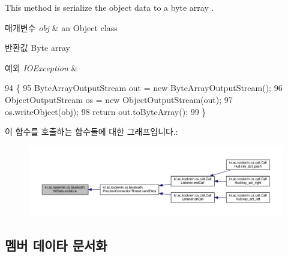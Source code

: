 This method is serialize the object data to a byte array . 


\begin{DoxyParams}{매개변수}
{\em obj} & an Object class \\
\hline
\end{DoxyParams}
\begin{DoxyReturn}{반환값}
Byte array 
\end{DoxyReturn}

\begin{DoxyExceptions}{예외}
{\em I\+O\+Exception} & \\
\hline
\end{DoxyExceptions}

\begin{DoxyCode}
94                                                                 \{
95     ByteArrayOutputStream out = \textcolor{keyword}{new} ByteArrayOutputStream();
96     ObjectOutputStream os = \textcolor{keyword}{new} ObjectOutputStream(out);
97     os.writeObject(obj);
98     \textcolor{keywordflow}{return} out.toByteArray();
99   \}
\end{DoxyCode}


이 함수를 호출하는 함수들에 대한 그래프입니다.\+:\nopagebreak
\begin{figure}[H]
\begin{center}
\leavevmode
\includegraphics[width=350pt]{classkr_1_1ac_1_1kookmin_1_1cs_1_1bluetooth_1_1_bt_data_ae0cad29a77ce0fd52299ff97b46b4a55_icgraph}
\end{center}
\end{figure}




\subsection{멤버 데이타 문서화}
\hypertarget{classkr_1_1ac_1_1kookmin_1_1cs_1_1bluetooth_1_1_bt_data_ad002da4be5c1342793210a47678c1b51}{}
